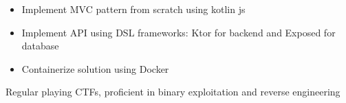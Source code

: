 \documentclass[10pt,a4paper,ragged2e,withhyper]{altacv}
\begin{document}
\begin{paracol}{2}
\divider

\begin{itemize}
\item Implement MVC pattern from scratch using kotlin js
\item Implement API using DSL frameworks: Ktor for backend and Exposed for database
\item Containerize solution using Docker
\end{itemize}



\medskip

Regular playing CTFs, proficient in binary exploitation and reverse engineering








\end{paracol}
\end{document}
